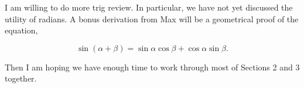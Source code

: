 \bigskip

\nobreak\bigskip

\noindent I am willing to do more trig review. In particular, we have not yet discussed the utility of radians. A bonus derivation from Max will be a geometrical proof of the equation,

$$\sin(\alpha + \beta) = \sin \alpha \cos \beta + \cos \alpha \sin \beta.$$

\noindent Then I am hoping we have enough time to work through most of Sections 2 and 3 together.

\noindent 
\bye
